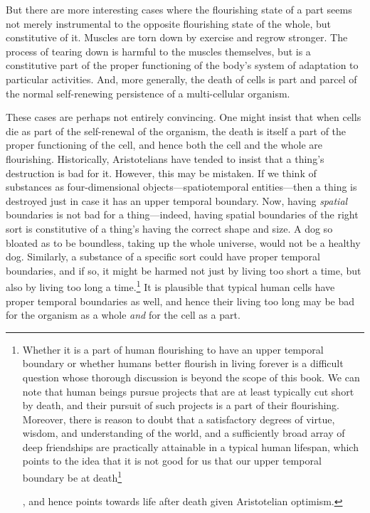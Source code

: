 But there are more interesting cases where the flourishing state of a part seems not merely instrumental to 
the opposite flourishing state of the whole, but constitutive of it. Muscles are torn down by exercise
and regrow stronger. The process of tearing down is harmful to the muscles themselves, but is a constitutive 
part of the proper functioning of the body's system of adaptation to particular activities. And, more
generally, the death of cells is part and parcel of the normal self-renewing persistence of a multi-cellular
organism.

These cases are perhaps not entirely convincing. One might insist that when cells die as part of the self-renewal
of the organism, the death is itself a part of the proper functioning of the cell, and hence both the cell and the
whole are flourishing. Historically, Aristotelians have tended to insist that a thing's destruction is bad
for it. However, this may be mistaken. If we think of substances as four-dimensional objects---spatiotemporal
entities---then a thing is destroyed just in case it has an upper temporal boundary. Now, having \textit{spatial} 
boundaries is not bad for a thing---indeed, having spatial boundaries of the right sort is constitutive of a thing's
having the correct shape and size. A dog so bloated as to be boundless, taking up the whole universe, would not be a 
healthy dog. Similarly, a substance of a specific sort could have proper temporal boundaries, and if so, it might be harmed not just by
living too short a time, but also by living too long a time.\footnote{
Whether it is a part of human flourishing to have an upper temporal boundary or whether humans better flourish
in living forever is a difficult
question whose thorough discussion is beyond the scope of this book. We can note that human beings 
pursue projects that  are at least typically cut short by death, and their pursuit of such projects 
is a part of their flourishing. Moreover, there is reason to doubt that a satisfactory degrees of virtue, wisdom, 
and understanding of the world, and a sufficiently broad array of deep friendships are practically 
attainable in a typical human lifespan, which points to the idea that it is not good for us that our upper
temporal boundary be at death\footnote{For contrary views, see defenses of Epicurean arguments~\parencite{RosenbaumDeath} and  pessimistic reflection on endless existence. Note that 
there is also an intermediate view on which our death is typically bad for us, but it wouldn't be good for us
to live forever---maybe a lifespan like 200 years, assuming full functioning throughout it, would be best.}

, and hence points towards life after death given Aristotelian optimism.} It is plausible that typical human cells have 
proper temporal boundaries as well, and hence their living too long may be bad for the organism as a whole
\textit{and} for the cell as a part.

